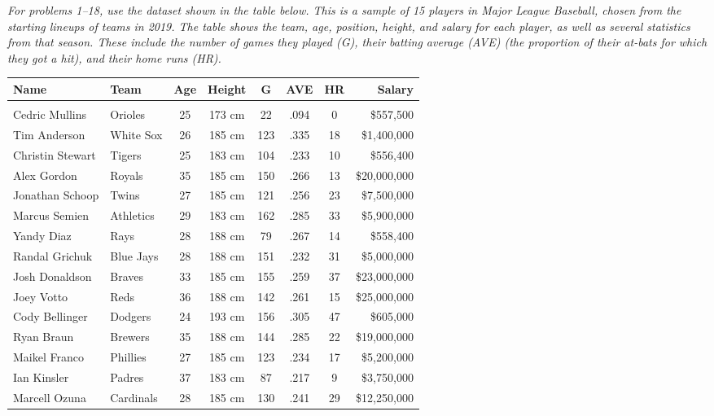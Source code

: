 \begin{exercises}
\emph{For problems 1--18, use the dataset shown in the table below.  This is a sample of 15 players in Major League Baseball, chosen from the starting lineups of teams in 2019.  The table shows the team, age, position, height, and salary for each player, as well as several statistics from that season.  These include the number of games they played (G), their batting average (AVE) (the proportion of their at-bats for which they got a hit), and their home runs (HR).}
\begin{center}
{%
\begin{tabular}{l l c c c c c r}
\textbf{Name} & \textbf{Team} & \textbf{Age} & \textbf{Height} & \textbf{G} & \textbf{AVE} & \textbf{HR} & \textbf{Salary}\\
\hline
& & & & & & & \\
Cedric Mullins & Orioles & 25 & 173 cm & 22 & .094 & 0 & \$557,500\\
Tim Anderson & White Sox & 26 & 185 cm & 123 & .335 & 18 & \$1,400,000\\
Christin Stewart & Tigers & 25 & 183 cm & 104 & .233 & 10 & \$556,400\\
Alex Gordon & Royals & 35 & 185 cm & 150 & .266 & 13 & \$20,000,000\\
Jonathan Schoop & Twins & 27 & 185 cm & 121 & .256 & 23 & \$7,500,000\\
Marcus Semien & Athletics & 29 & 183 cm & 162 & .285 & 33 & \$5,900,000\\
Yandy Diaz & Rays & 28 & 188 cm & 79 & .267 & 14 & \$558,400\\
Randal Grichuk & Blue Jays & 28 & 188 cm & 151 & .232 & 31 & \$5,000,000\\
Josh Donaldson & Braves & 33 & 185 cm & 155 & .259 & 37 & \$23,000,000\\
Joey Votto & Reds & 36 & 188 cm & 142 & .261 & 15 & \$25,000,000\\
Cody Bellinger & Dodgers & 24 & 193 cm & 156 & .305 & 47 & \$605,000\\
Ryan Braun & Brewers & 35 & 188 cm & 144 & .285 & 22 & \$19,000,000\\
Maikel Franco & Phillies & 27 & 185 cm & 123 & .234 & 17 & \$5,200,000\\
Ian Kinsler & Padres & 37 & 183 cm & 87 & .217 & 9 & \$3,750,000\\
Marcell Ozuna & Cardinals & 28 & 185 cm & 130 & .241 & 29 & \$12,250,000\\
\end{tabular}}
\end{center}


\end{exercises}
